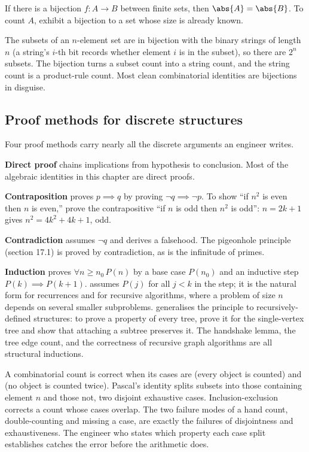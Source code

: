 \begin{principle}
If there is a bijection $f: A \to B$ between finite sets, then
$\abs{A} = \abs{B}$. To count $A$, exhibit a bijection to a set
whose size is already known.
\end{principle}

The subsets of an $n$-element set are in bijection with the binary
strings of length $n$ (a string's $i$-th bit records whether element
$i$ is in the subset), so there are $2^{n}$ subsets. The bijection
turns a subset count into a string count, and the string count is a
product-rule count. Most clean combinatorial identities are
bijections in disguise.

\subsection{Proof methods for discrete structures}

Four proof methods carry nearly all the discrete arguments an
engineer writes.

\textbf{Direct proof} chains implications from hypothesis to
conclusion. Most of the algebraic identities in this chapter are
direct proofs.

\textbf{Contraposition} proves $p \implies q$ by proving $\lnot q
\implies \lnot p$. To show ``if $n^{2}$ is even then $n$ is even,''
prove the contrapositive ``if $n$ is odd then $n^{2}$ is odd'':
$n = 2k + 1$ gives $n^{2} = 4k^{2} + 4k + 1$, odd.

\textbf{Contradiction} assumes $\lnot q$ and derives a falsehood.
The pigeonhole principle (section 17.1) is proved by contradiction,
as is the infinitude of primes.

\textbf{Induction} proves $\forall n \geq n_{0}\, P(n)$ by a base
case $P(n_{0})$ and an inductive step $P(k) \implies P(k+1)$.
 assumes $P(j)$ for all $j < k$ in the
step; it is the natural form for recurrences and for recursive
algorithms, where a problem of size $n$ depends on several smaller
subproblems.  generalises the
principle to recursively-defined structures: to prove a property of
every tree, prove it for the single-vertex tree and show that
attaching a subtree preserves it. The handshake lemma, the tree
edge count, and the correctness of recursive graph algorithms are
all structural inductions.

\begin{archetype}
A combinatorial count is correct when its cases are
 (every object is counted) and
 (no object is counted twice). Pascal's identity
splits subsets into those containing element $n$ and those not, two
disjoint exhaustive cases. Inclusion-exclusion corrects a count
whose cases overlap. The two failure modes of a hand count,
double-counting and missing a case, are exactly the failures of
disjointness and exhaustiveness. The engineer who states which
property each case split establishes catches the error before the
arithmetic does.
\end{archetype}

